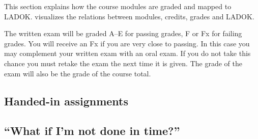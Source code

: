 This section explains how the course modules are graded and mapped to LADOK\@.
 visualizes the relations between modules, credits, grades and 
LADOK\@.

\begin{frame}
  
\end{frame}

The written exam will be graded A--E for passing grades, F or Fx for failing 
grades.
You will receive an Fx if you are very close to passing.
In this case you may complement your written exam with an oral exam.
If you do not take this chance you must retake the exam the next 
time it is given.
The grade of the exam will also be the grade of the course total.

\subsection{Handed-in assignments}


\subsection{\enquote{What if I'm not done in time?}}%
\label{sec:late}



\printbibliography{}
